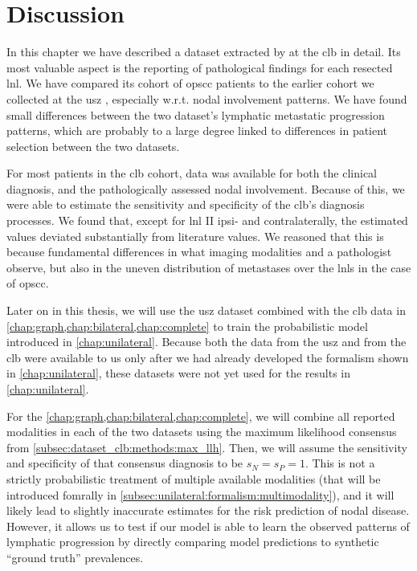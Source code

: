 \documentclass[\relativeRoot/main.tex]{subfiles}
\begin{document}
\section{Discussion}
\label{sec:dataset_clb:discussion}

In this chapter we have described a dataset extracted by  at the \gls{clb} in detail. Its most valuable aspect is the reporting of pathological findings for each resected \gls{lnl}. We have compared its cohort of \gls{opscc} patients to the earlier cohort we collected at the \gls{usz} \cite{ludwig_detailed_2022}, especially w.r.t. nodal involvement patterns. We have found small differences between the two dataset's lymphatic metastatic progression patterns, which are probably to a large degree linked to differences in patient selection between the two datasets.

For most patients in the \gls{clb} cohort, data was available for both the clinical diagnosis, and the pathologically assessed nodal involvement. Because of this, we were able to estimate the sensitivity and specificity of the \gls{clb}'s diagnosis processes. We found that, except for \gls{lnl} II ipsi- and contralaterally, the estimated values deviated substantially from literature values. We reasoned that this is because fundamental differences in what imaging modalities and a pathologist observe, but also in the uneven distribution of metastases over the \glspl{lnl} in the case of \gls{opscc}.

Later on in this thesis, we will use the \gls{usz} dataset combined with the \gls{clb} data in \cref{chap:graph,chap:bilateral,chap:complete} to train the probabilistic model introduced in \cref{chap:unilateral}. Because both the data from the \gls{usz} and from the \gls{clb} were available to us only after we had already developed the formalism shown in \cref{chap:unilateral}, these datasets were not yet used for the results in \cref{chap:unilateral}.

For the \cref{chap:graph,chap:bilateral,chap:complete}, we will combine all reported modalities in each of the two datasets using the maximum likelihood consensus from \cref{subsec:dataset_clb:methods:max_llh}. Then, we will assume the sensitivity and specificity of that consensus diagnosis to be $s_N = s_P = 1$. This is not a strictly probabilistic treatment of multiple available modalities (that will be introduced fomrally in \cref{subsec:unilateral:formalism:multimodality}), and it will likely lead to slightly inaccurate estimates for the risk prediction of nodal disease. However, it allows us to test if our model is able to learn the observed patterns of lymphatic progression by directly comparing model predictions to synthetic ``ground truth'' prevalences.
\end{document}
